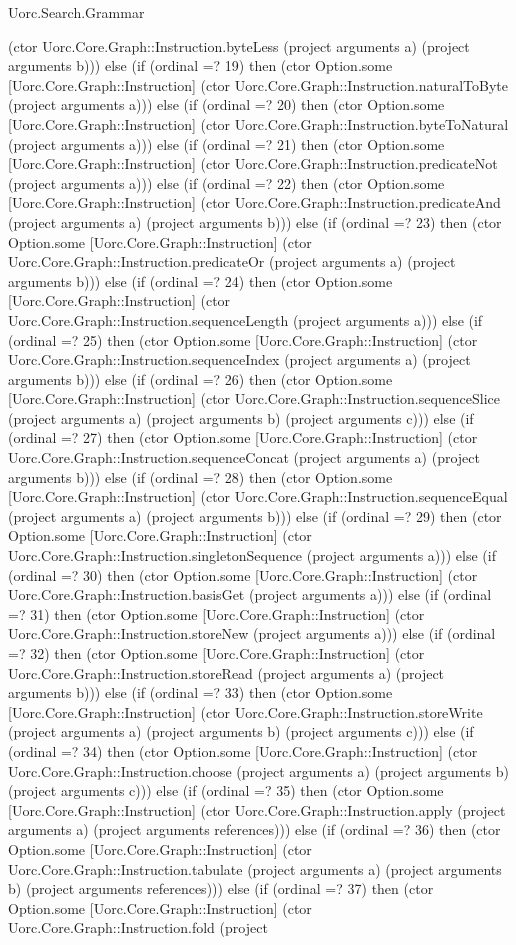 \begin{lexlean}{Uorc.Search.Grammar}
\begin{semanticmodule}
{(ctor Uorc.Core.Graph::Instruction.byteLess (project arguments a) (project arguments b))) else (if (ordinal =? 19) then (ctor Option.some [Uorc.Core.Graph::Instruction] (ctor Uorc.Core.Graph::Instruction.naturalToByte (project arguments a))) else (if (ordinal =? 20) then (ctor Option.some [Uorc.Core.Graph::Instruction] (ctor Uorc.Core.Graph::Instruction.byteToNatural (project arguments a))) else (if (ordinal =? 21) then (ctor Option.some [Uorc.Core.Graph::Instruction] (ctor Uorc.Core.Graph::Instruction.predicateNot (project arguments a))) else (if (ordinal =? 22) then (ctor Option.some [Uorc.Core.Graph::Instruction] (ctor Uorc.Core.Graph::Instruction.predicateAnd (project arguments a) (project arguments b))) else (if (ordinal =? 23) then (ctor Option.some [Uorc.Core.Graph::Instruction] (ctor Uorc.Core.Graph::Instruction.predicateOr (project arguments a) (project arguments b))) else (if (ordinal =? 24) then (ctor Option.some [Uorc.Core.Graph::Instruction] (ctor Uorc.Core.Graph::Instruction.sequenceLength (project arguments a))) else (if (ordinal =? 25) then (ctor Option.some [Uorc.Core.Graph::Instruction] (ctor Uorc.Core.Graph::Instruction.sequenceIndex (project arguments a) (project arguments b))) else (if (ordinal =? 26) then (ctor Option.some [Uorc.Core.Graph::Instruction] (ctor Uorc.Core.Graph::Instruction.sequenceSlice (project arguments a) (project arguments b) (project arguments c))) else (if (ordinal =? 27) then (ctor Option.some [Uorc.Core.Graph::Instruction] (ctor Uorc.Core.Graph::Instruction.sequenceConcat (project arguments a) (project arguments b))) else (if (ordinal =? 28) then (ctor Option.some [Uorc.Core.Graph::Instruction] (ctor Uorc.Core.Graph::Instruction.sequenceEqual (project arguments a) (project arguments b))) else (if (ordinal =? 29) then (ctor Option.some [Uorc.Core.Graph::Instruction] (ctor Uorc.Core.Graph::Instruction.singletonSequence (project arguments a))) else (if (ordinal =? 30) then (ctor Option.some [Uorc.Core.Graph::Instruction] (ctor Uorc.Core.Graph::Instruction.basisGet (project arguments a))) else (if (ordinal =? 31) then (ctor Option.some [Uorc.Core.Graph::Instruction] (ctor Uorc.Core.Graph::Instruction.storeNew (project arguments a))) else (if (ordinal =? 32) then (ctor Option.some [Uorc.Core.Graph::Instruction] (ctor Uorc.Core.Graph::Instruction.storeRead (project arguments a) (project arguments b))) else (if (ordinal =? 33) then (ctor Option.some [Uorc.Core.Graph::Instruction] (ctor Uorc.Core.Graph::Instruction.storeWrite (project arguments a) (project arguments b) (project arguments c))) else (if (ordinal =? 34) then (ctor Option.some [Uorc.Core.Graph::Instruction] (ctor Uorc.Core.Graph::Instruction.choose (project arguments a) (project arguments b) (project arguments c))) else (if (ordinal =? 35) then (ctor Option.some [Uorc.Core.Graph::Instruction] (ctor Uorc.Core.Graph::Instruction.apply (project arguments a) (project arguments references))) else (if (ordinal =? 36) then (ctor Option.some [Uorc.Core.Graph::Instruction] (ctor Uorc.Core.Graph::Instruction.tabulate (project arguments a) (project arguments b) (project arguments references))) else (if (ordinal =? 37) then (ctor Option.some [Uorc.Core.Graph::Instruction] (ctor Uorc.Core.Graph::Instruction.fold (project }
\end{semanticmodule}
\end{lexlean}
